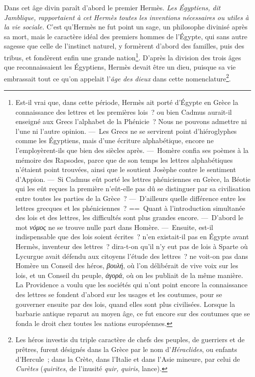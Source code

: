 \documentclass[french,twoside]{book} %
\newcommand\foreign[1]{\emph{#1}}
\begin{document}
 Dans cet âge divin paraît d’abord le premier Hermès. \emph{{\itshape Les Égyptiens}, dit Jamblique, {\itshape  rapportaient à cet Hermès toutes les inventions nécessaires ou utiles à la vie sociale.}} C’est qu’Hermès ne fut point un sage, un philosophe divinisé après sa mort, mais le caractère idéal des premiers hommes de l’Égypte, qui sans autre sagesse que celle de l’instinct naturel, y formèrent d’abord des familles, puis des tribus, et fondèrent enfin une grande nation\footnote{Est-il vrai que, dans cette période, Hermès ait porté d’Égypte en Grèce la connaissance des lettres et les premières lois ? ou bien Cadmus aurait-il enseigné aux Grecs l’alphabet de la Phénicie ? Nous ne pouvons admettre ni l’une ni l’autre opinion. — Les Grecs ne se servirent point d’hiéroglyphes comme les Égyptiens, mais d’une écriture alphabétique, encore ne l’employèrent-ils que bien des siècles après. — Homère confia ses poèmes à la mémoire des Rapsodes, parce que de son temps les lettres alphabétiques n’étaient point trouvées, ainsi que le soutient Josèphe contre le sentiment d’Appion. — Si Cadmus eût porté les lettres phéniciennes en Grèce, la Béotie qui les eût reçues la première n’eût-elle pas dû se distinguer par sa civilisation entre toutes les parties de la Grèce ? — D’ailleurs quelle différence entre les lettres grecques et les phéniciennes ? == Quant à l’introduction simultanée des lois et des lettres, les difficultés sont plus grandes encore. — D’abord le mot \foreign{νόμος} ne se trouve nulle part dans Homère. — Ensuite, est-il indispensable que des lois soient écrites ? n’en existait-il pas en Égypte avant Hermès, inventeur des lettres ? dira-t-on qu’il n’y eut pas de lois à Sparte où Lycurgue avait défendu aux citoyens l’étude des lettres ? ne voit-on pas dans Homère un Conseil des héros, \foreign{βουλή}, où l’on délibérait de vive voix sur les lois, et un Conseil du peuple, \foreign{ἀγορά}, où on les publiait de la même manière. La Providence a voulu que les sociétés qui n’ont point encore la connaissance des lettres se fondent d’abord sur les usages et les coutumes, pour se gouverner ensuite par des lois, quand elles sont plus civilisées. Lorsque la barbarie antique reparut au moyen âge, ce fut encore sur des coutumes que se fonda le droit chez toutes les nations européennes.}. D’après la division des trois âges que reconnaissaient les Égyptiens,  Hermès devait être un dieu, puisque sa vie embrassait tout ce qu’on appelait l’{\itshape âge des dieux} dans cette nomenclature\footnote{Les héros investis du triple caractère de chefs des peuples, de guerriers et de prêtres, furent désignés dans la Grèce par le nom d’{\itshape Héraclides}, ou enfants d’Hercule ; dans la Crète, dans l’Italie et dans l’Asie mineure, par celui de {\itshape Curètes} ({\itshape quirites}, de l’inusité {\itshape quir, quiris}, lance).}.\par
\end{document}
